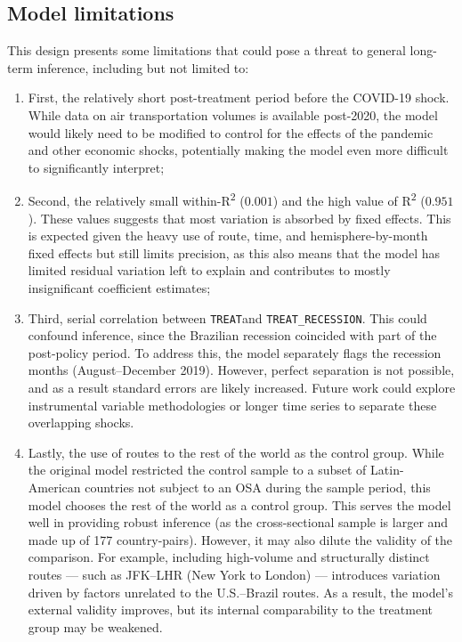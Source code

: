 \documentclass[12pt]{article}
\begin{document}
\subsection{Model limitations}
This design presents some limitations that could pose a threat to general long-term inference, including but not limited to:
\begin{enumerate}
    \item [i.] First, the relatively short post-treatment period before the COVID-19 shock. While data on air transportation volumes is available post-2020, the model would likely need to be modified to control for the effects of the pandemic and other economic shocks, potentially making the model even more difficult to significantly interpret;
    \item [ii.] Second, the relatively small within-R\textsuperscript{2} ($0.001$) and the high value of R\textsuperscript{2} ($0.951$). These values suggests that most variation is absorbed by fixed effects. This is expected given the heavy use of route, time, and hemisphere-by-month fixed effects but still limits precision, as this also means that the model has limited residual variation left to explain and contributes to mostly insignificant coefficient estimates;
    \item [iii.] Third, serial correlation between \texttt{TREAT}and \texttt{TREAT\_RECESSION}. This could confound inference, since the Brazilian recession coincided with part of the post-policy period. To address this, the model separately flags the recession months (August–December 2019). However, perfect separation is not possible, and as a result standard errors are likely increased. Future work could explore instrumental variable methodologies or longer time series to separate these overlapping shocks.
\item[iv.] Lastly, the use of routes to the rest of the world as the control group. While the original model restricted the control sample to a subset of Latin-American countries not subject to an OSA during the sample period, this model chooses the rest of the world as a control group. This serves the model well in providing robust inference (as the cross-sectional sample is larger and made up of 177 country-pairs). However, it may also dilute the validity of the comparison. For example, including high-volume and structurally distinct routes --- such as JFK–LHR (New York to London) --- introduces variation driven by factors unrelated to the U.S.–Brazil routes. As a result, the model’s external validity improves, but its internal comparability to the treatment group may be weakened.
\end{enumerate}
\end{document}
